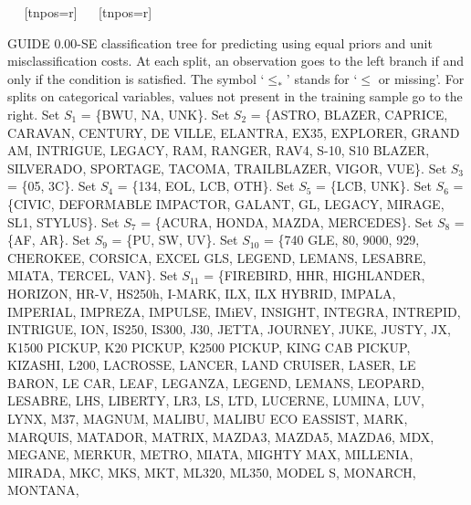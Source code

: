 \documentclass{article}
\begin{document}
\begin{landscape}
\begin{center}
{{{{{{{{{  
 \TC[fillcolor=red,fillstyle=solid]~{}
    ~[tnpos=r]{}
   }
   }
   }
   }
   }
   }
   }
 \TC[fillcolor=red,fillstyle=solid]~{}
    ~[tnpos=r]{}
 }
 }
 \end{center}
GUIDE  0.00-SE classification tree for predicting \texttt{} using
 equal priors
 and unit misclassification costs.
At each split, an observation goes to the left branch 
 if and only if the condition is satisfied.
 The symbol `$\leq_*$' stands for `$\leq$ or missing'.
For splits on categorical variables,
 values not present in the training sample go to the right.
Set $S_{1}$ = \{BWU, NA, UNK\}.
Set $S_{2}$ = \{ASTRO, BLAZER, CAPRICE, CARAVAN, CENTURY, DE VILLE, ELANTRA,
 EX35, EXPLORER, GRAND AM, INTRIGUE, LEGACY, RAM, RANGER, RAV4, S-10,
 S10 BLAZER, SILVERADO, SPORTAGE, TACOMA, TRAILBLAZER, VIGOR, VUE\}.
Set $S_{3}$ = \{05, 3C\}.
Set $S_{4}$ = \{134, EOL, LCB, OTH\}.
Set $S_{5}$ = \{LCB, UNK\}.
Set $S_{6}$ = \{CIVIC, DEFORMABLE IMPACTOR, GALANT, GL, LEGACY, MIRAGE, SL1,
 STYLUS\}.
Set $S_{7}$ = \{ACURA, HONDA, MAZDA, MERCEDES\}.
Set $S_{8}$ = \{AF, AR\}.
Set $S_{9}$ = \{PU, SW, UV\}.
Set $S_{10}$ = \{740 GLE, 80, 9000, 929, CHEROKEE, CORSICA, EXCEL GLS, LEGEND,
 LEMANS, LESABRE, MIATA, TERCEL, VAN\}.
Set $S_{11}$ = \{FIREBIRD, HHR, HIGHLANDER, HORIZON, HR-V, HS250h, I-MARK, ILX,
 ILX HYBRID, IMPALA, IMPERIAL, IMPREZA, IMPULSE, IMiEV, INSIGHT, INTEGRA,
 INTREPID, INTRIGUE, ION, IS250, IS300, J30, JETTA, JOURNEY, JUKE, JUSTY, JX,
 K1500 PICKUP, K20 PICKUP, K2500 PICKUP, KING CAB PICKUP, KIZASHI, L200,
 LACROSSE, LANCER, LAND CRUISER, LASER, LE BARON, LE CAR, LEAF, LEGANZA,
 LEGEND, LEMANS, LEOPARD, LESABRE, LHS, LIBERTY, LR3, LS, LTD, LUCERNE, LUMINA,
 LUV, LYNX, M37, MAGNUM, MALIBU, MALIBU ECO EASSIST, MARK, MARQUIS, MATADOR,
 MATRIX, MAZDA3, MAZDA5, MAZDA6, MDX, MEGANE, MERKUR, METRO, MIATA, MIGHTY MAX,
 MILLENIA, MIRADA, MKC, MKS, MKT, ML320, ML350, MODEL S, MONARCH, MONTANA,

\end{landscape}
\end{document}
